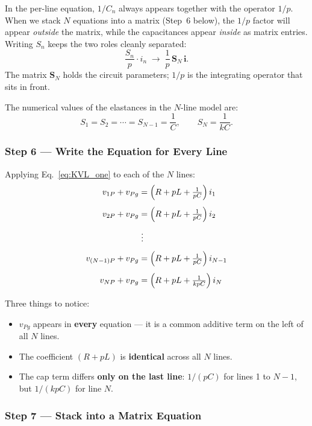 \begin{physbox}
In the per-line equation, $1/C_n$ always appears together with
the operator $1/p$.  When we stack $N$ equations into a matrix
(Step~6 below), the $1/p$ factor will appear \emph{outside} the
matrix, while the capacitances appear \emph{inside} as matrix entries.
Writing $S_n$ keeps the two roles cleanly separated:
\[
    \frac{S_n}{p}\cdot i_n
    \;\longrightarrow\;
    \frac{1}{p}\,\mathbf{S}_N\,\mathbf{i}.
\]
The matrix $\mathbf{S}_N$ holds the circuit parameters;
$1/p$ is the integrating operator that sits in front.
\end{physbox}

The numerical values of the elastances in the $N$-line model are:
\[
    S_1 = S_2 = \cdots = S_{N-1} = \frac{1}{C},
    \qquad
    S_N = \frac{1}{kC}.
\]

\subsubsection*{Step 6 — Write the Equation for Every Line}

Applying Eq.~\eqref{eq:KVL_one} to each of the $N$ lines:
\begin{align*}
    v_{1P} + v_{Pg}
        &= \Bigl(R + pL + \tfrac{1}{pC}\Bigr)\,i_1 \\[4pt]
    v_{2P} + v_{Pg}
        &= \Bigl(R + pL + \tfrac{1}{pC}\Bigr)\,i_2 \\[4pt]
        &\;\vdots \\[4pt]
    v_{(N-1)P} + v_{Pg}
        &= \Bigl(R + pL + \tfrac{1}{pC}\Bigr)\,i_{N-1} \\[4pt]
    v_{NP} + v_{Pg}
        &= \Bigl(R + pL + \tfrac{1}{kpC}\Bigr)\,i_N
\end{align*}

Three things to notice:
\begin{itemize}
    \item $v_{Pg}$ appears in \textbf{every} equation — it is a
          common additive term on the left of all $N$ lines.
    \item The coefficient $(R + pL)$ is \textbf{identical} across
          all $N$ lines.
    \item The cap term differs \textbf{only on the last line}:
          $1/(pC)$ for lines 1 to $N-1$, but $1/(kpC)$ for line $N$.
\end{itemize}

\subsubsection*{Step 7 — Stack into a Matrix Equation}

